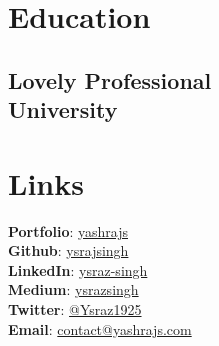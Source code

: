 \documentclass[]{deedy-resume-openfont}
\begin{document}
    \renewcommand{\baselinestretch}{1.08}

    


    \begin{minipage}[t]{0.33\textwidth} 


    \section{Education}  
    \vspace{4pt}  
    \subsection{Lovely Professional \\ University}  
    \sectionsep  



    \section{Links} 
    \vspace{4pt}  
    \textbf{Portfolio}: \href{http://yashrajs.com/}{yashrajs} \\
    \vspace{3pt}  
    \textbf{Github}: \href{https://github.com/ysrajsingh}{ysrajsingh} \\
    \vspace{3pt}  
    \textbf{LinkedIn}: \href{https://www.linkedin.com/in/ysraz-singh/}{ysraz-singh} \\
    \vspace{3pt}  
    \textbf{Medium}: \href{https://ysrazsingh.medium.com/}{ysrazsingh} \\
    \vspace{3pt}  
    \textbf{Twitter}: \href{https://x.com/Ysraz1925}{@Ysraz1925} \\
    \vspace{3pt}  
    \textbf{Email}: \href{mailto:contact@yashrajs.com}{contact@yashrajs.com}



\end{minipage}
\end{document}
